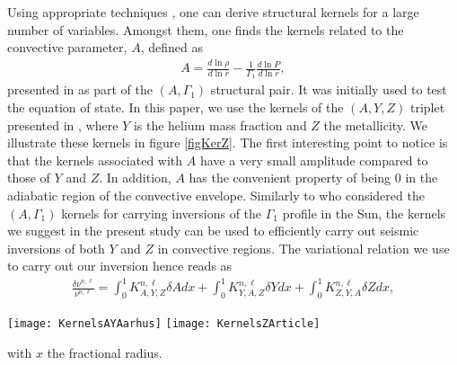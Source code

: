 \documentclass[a4paper,fleqn,usenatbib]{mnras}
\begin{document}
Using appropriate techniques \citep[see][]{BuldgenKer}, one can derive structural kernels for a large number of variables. Amongst them, one finds the kernels related to the convective parameter, $A$, defined as
\begin{align}
A=\frac{d \ln \rho}{d \ln r}-\frac{1}{\Gamma_{1}}\frac{d \ln P}{d \ln r},
\end{align}
presented in \citet{Elliott} as part of the $(A,\Gamma_{1})$ structural pair. It was initially used to test the equation of state. In this paper, we use the kernels of the $(A,Y,Z)$ triplet presented in \citet{BuldgenKer}, where $Y$ is the helium mass fraction and $Z$ the metallicity. We illustrate these kernels in figure \ref{figKerZ}. The first interesting point to notice is that the kernels associated with $A$ have a very small amplitude compared to those of $Y$ and $Z$. In addition, $A$ has the convenient property of being $0$ in the adiabatic region of the convective envelope. Similarly to \cite{Elliott} who considered the $(A,\Gamma_{1})$ kernels for carrying inversions of the $\Gamma_{1}$ profile in the Sun, the kernels we suggest in the present study can be used to efficiently carry out seismic inversions of both $Y$ and $Z$ in convective regions. The variational relation we use to carry out our inversion hence reads as
\begin{align}
\frac{\delta \nu^{n,\ell}}{\nu^{n,\ell}}=\int_{0}^{1}K_{A,Y,Z}^{n,\ell}\delta A dx + \int_{0}^{1}K_{Y,A,Z}^{n,\ell}\delta Y dx+ \int_{0}^{1}K_{Z,Y,A}^{n,\ell}\delta Z dx, \label{eqInvZ}
\end{align}
\begin{figure*}
	\centering
		\texttt{[image: KernelsAYAarhus]}
		\texttt{[image: KernelsZArticle]}
	\caption{Kernels of the $(A,Y,Z)$ triplet for various oscillation modes (Upper left panel, $A$ Kernels) (Upper right panel, $Y$ kernels) (Lower panel, $Z$ kernels)}
		\label{figKerZ}
\end{figure*} 
with $x$ the fractional radius.
\end{document}
